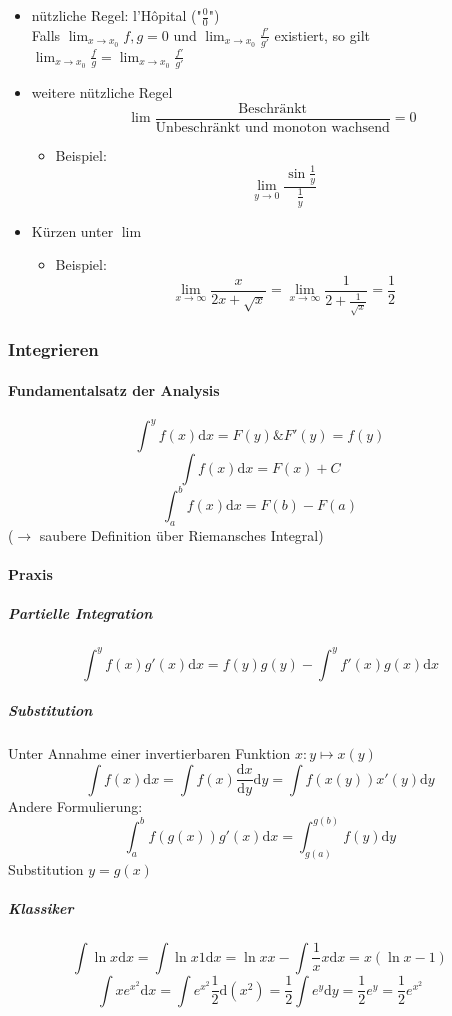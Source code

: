 \documentclass[a4paper]{scrartcl}
\theoremstyle{definition}
\theoremstyle{plain}
\theoremstyle{remark}
\begin{document}
\begin{itemize}
\begin{itemize}
\item nützliche Regel: l'Hôpital ("$\frac{0}{0}$") \\
        Falls $\lim_{x\to x_0} f,g = 0$ und $\lim_{x\to x_0} \frac{f'}{g'}$ existiert, so gilt $\lim_{x\to x_0}\frac{f}{g} = \lim_{x\to x_0} \frac{f'}{g'}$
\item weitere nützliche Regel \[\lim \frac{\text{Beschränkt}}{\text{Unbeschränkt und monoton wachsend}} = 0\]
\begin{itemize}
\item Beispiel: \[\lim_{y\to 0} \frac{\sin{\frac{1}{y}}}{\frac{1}{y}}\]
\end{itemize}
\item Kürzen unter $\lim$
\begin{itemize}
\item Beispiel: \[\lim_{x\to\infty} \frac{x}{2x + \sqrt{x}} = \lim_{x\to\infty}\frac{1}{2+\frac{1}{\sqrt{x}}} = \frac{1}{2}\]
\end{itemize}
\end{itemize}
\end{itemize}
\subsubsection{Integrieren}
\label{sec-2-2-3}
\paragraph{Fundamentalsatz der Analysis}
\label{sec-2-2-3-1}
\[\int^y f(x)\mathrm{d}x = F(y) \& F'(y) = f(y)\]
\[\int f(x)\mathrm{d}x = F(x) + C\]
\[\int_a^b f(x)\mathrm{d}x = F(b) - F(a)\]
($\to$ saubere Definition über Riemansches Integral)
\paragraph{Praxis}
\label{sec-2-2-3-2}
\subparagraph{Partielle Integration}
\label{sec-2-2-3-2-1}
\[\int^y f(x)g'(x)\mathrm{d}x = f(y)g(y) - \int^y f'(x)g(x)\mathrm{d}x\]
\subparagraph{Substitution}
\label{sec-2-2-3-2-2}
Unter Annahme einer invertierbaren Funktion $x: y\mapsto x(y)$
\[\int f(x)\mathrm{d}x = \int f(x)\frac{\mathrm{d}x}{\mathrm{d}y}\mathrm{d}y = \int f(x(y)) x'(y)\mathrm{d}y\]
Andere Formulierung: \[\int_a^b f(g(x))g'(x)\mathrm{d}x = \int_{g(a)}^{g(b)}f(y)\mathrm{d}y\]
Substitution $y=g(x)$
\subparagraph{Klassiker}
\label{sec-2-2-3-2-3}
\[\int \ln{x}\mathrm{d}x = \int \ln{x}1\mathrm{d}x = \ln{x}x - \int \frac{1}{x}x\mathrm{d}x = x(\ln{x} - 1)\]
\[\int x e^{x^2}\mathrm{d}x = \int e^{x^2}\frac{1}{2}\mathrm{d}(x^2) = \frac{1}{2}\int e^y \mathrm{d}y = \frac{1}{2}e^y = \frac{1}{2}e^{x^2}\]
\end{document}
